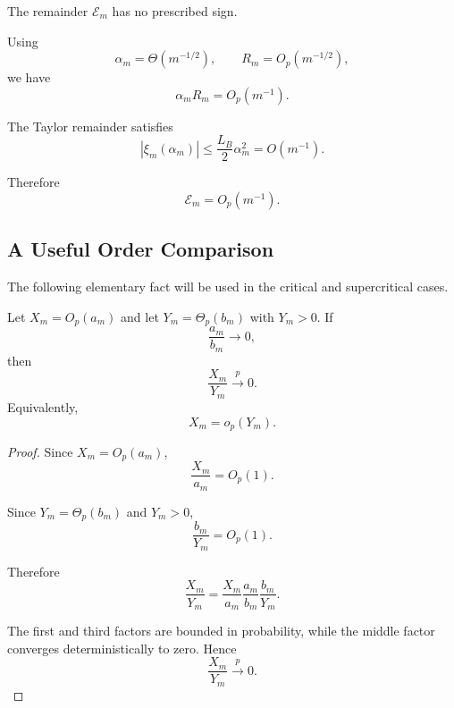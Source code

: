 The remainder $\mathcal E_m$ has no prescribed sign.

Using
\begin{equation}
\alpha_m=\Theta(m^{-1/2}),
\qquad
R_m=O_p(m^{-1/2}),
\end{equation}
we have
\begin{equation}
\alpha_mR_m
=
O_p(m^{-1}).
\end{equation}

The Taylor remainder satisfies
\begin{equation}
|\xi_m(\alpha_m)|
\leq
\frac{L_B}{2}\alpha_m^2
=
O(m^{-1}).
\end{equation}

Therefore
\begin{equation}
\mathcal E_m
=
O_p(m^{-1}).
\label{eq:E_order}
\end{equation}


\subsection{A Useful Order Comparison}

The following elementary fact will be used in the critical and
supercritical cases.

\begin{lemma}
\label{lem:order_ratio}
Let $X_m=O_p(a_m)$ and let $Y_m=\Theta_p(b_m)$ with $Y_m>0$. If
\begin{equation}
\frac{a_m}{b_m}\rightarrow0,
\end{equation}
then
\begin{equation}
\frac{X_m}{Y_m}
\xrightarrow{p}
0.
\end{equation}
Equivalently,
\begin{equation}
X_m=o_p(Y_m).
\end{equation}
\end{lemma}

\begin{proof}
Since $X_m=O_p(a_m)$,
\begin{equation}
\frac{X_m}{a_m}
=
O_p(1).
\end{equation}

Since $Y_m=\Theta_p(b_m)$ and $Y_m>0$,
\begin{equation}
\frac{b_m}{Y_m}
=
O_p(1).
\end{equation}

Therefore
\begin{equation}
\frac{X_m}{Y_m}
=
\frac{X_m}{a_m}
\frac{a_m}{b_m}
\frac{b_m}{Y_m}.
\end{equation}

The first and third factors are bounded in probability, while the middle
factor converges deterministically to zero. Hence
\begin{equation}
\frac{X_m}{Y_m}
\xrightarrow{p}
0.
\end{equation}
\end{proof}


